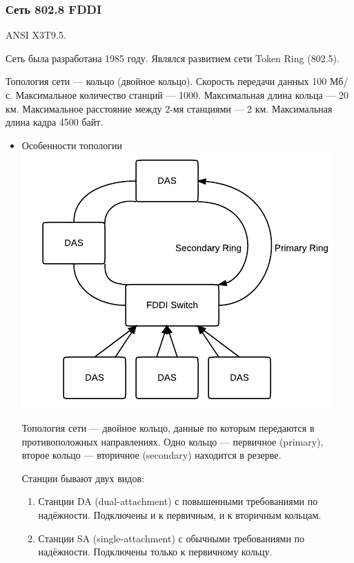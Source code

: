 \documentclass[12pt, russian, oneside, article]{ncc}
\begin{document}
\subsubsection{Сеть 802.8 FDDI}
\label{sec-5_2_2}


ANSI X3T9.5.

Сеть была разработана 1985 году. Являлся развитием сети Token Ring (802.5).

Топология сети --- кольцо (двойное кольцо). Скорость передачи данных 100 Мб/с. Максимальное количество станций --- 1000. Максимальная длина кольца --- 20 км. Максимальное расстояние между 2-мя станциями --- 2 км. Максимальная длина кадра 4500 байт.
\begin{itemize}

\item Особенности топологии\\
\label{sec-5_2_2_1}%
\includegraphics[]{images/SiSPI/fddi.png}

Топология сети --- двойное кольцо, данные по которым передаются в противоположных направлениях. Одно кольцо --- первичное (primary), второе кольцо --- вторичное (secondary) находится в резерве.

Станции бывают двух видов:
\begin{enumerate}
\item Станции DA (dual-attachment) с повышенными требованиями по надёжности. Подключены и к первичным, и к вторичным кольцам.
\item Станции SA (single-attachment) с обычными требованиями по надёжности. Подключены только к первичному кольцу.
\end{enumerate}


\end{itemize}
\end{document}
